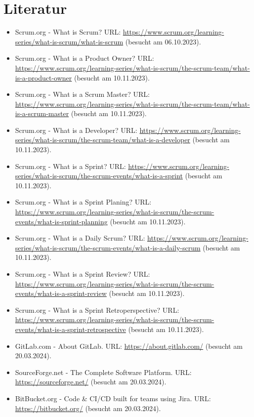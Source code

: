 \chapter{Literatur}
\begin{itemize}[leftmargin=0pt]
    \item Scrum.org - What is Scrum? {\scriptsize URL:} \url{https://www.scrum.org/learning-series/what-is-scrum/what-is-scrum} (besucht am 06.10.2023).
    \item Scrum.org - What is a Product Owner? {\scriptsize URL:} \url{https://www.scrum.org/learning-series/what-is-scrum/the-scrum-team/what-is-a-product-owner} (besucht am 10.11.2023).
    \item Scrum.org - What is a Scrum Master? {\scriptsize URL:} \url{https://www.scrum.org/learning-series/what-is-scrum/the-scrum-team/what-is-a-scrum-master} (besucht am 10.11.2023).
    \item Scrum.org - What is a Developer? {\scriptsize URL:} \url{https://www.scrum.org/learning-series/what-is-scrum/the-scrum-team/what-is-a-developer} (besucht am 10.11.2023).
    \item Scrum.org - What is a Sprint? {\scriptsize URL:} \url{https://www.scrum.org/learning-series/what-is-scrum/the-scrum-events/what-is-a-sprint} (besucht am 10.11.2023).
    \item Scrum.org - What is a Sprint Planing? {\scriptsize URL:} \url{https://www.scrum.org/learning-series/what-is-scrum/the-scrum-events/what-is-sprint-planning} (besucht am 10.11.2023).
    \item Scrum.org - What is a Daily Scrum? {\scriptsize URL:} \url{https://www.scrum.org/learning-series/what-is-scrum/the-scrum-events/what-is-a-daily-scrum} (besucht am 10.11.2023).
    \item Scrum.org - What is a Sprint Review? {\scriptsize URL:} \url{https://www.scrum.org/learning-series/what-is-scrum/the-scrum-events/what-is-a-sprint-review} (besucht am 10.11.2023).
    \item Scrum.org - What is a Sprint Retroperspective? {\scriptsize URL:} \url{https://www.scrum.org/learning-series/what-is-scrum/the-scrum-events/what-is-a-sprint-retrospective} (besucht am 10.11.2023).
    \item GitLab.com - About GitLab. {\scriptsize URL:} \url{https://about.gitlab.com/} (besucht am 20.03.2024).
    \item SourceForge.net - The Complete Software Platform. {\scriptsize URL:} \url{https://sourceforge.net/} (besucht am 20.03.2024).
    \item BitBucket.org - Code & CI/CD built for teams using Jira. {\scriptsize URL:} \url{https://bitbucket.org/} (besucht am 20.03.2024).

\end{itemize}
